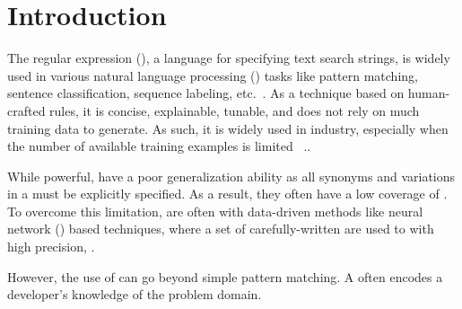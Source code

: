 \section{Introduction}


The regular expression (\RE), a language for specifying text search strings, is widely used in various natural language processing (\NLP)
tasks like pattern matching, sentence classification, sequence labeling, etc.~\cite{chang2014tokensregex}.
As a technique based on human-crafted rules, it is concise, explainable, tunable, and does not rely on much training data to generate. As
such, it is widely used in industry, especially when the number of available training examples is limited ~\cite{gc2015big}.. 

While powerful, \REs have a poor generalization ability as all synonyms and variations in a \RE must be explicitly specified. As a result,
they often have a low coverage of . To overcome this limitation, \REs are often  with data-driven methods like neural network
(\NN) based techniques, where a set of carefully-written \REs are used to
with high precision, .

However, the use of \REs can go beyond simple pattern matching.
A \RE often encodes a developer's knowledge of the problem domain.




